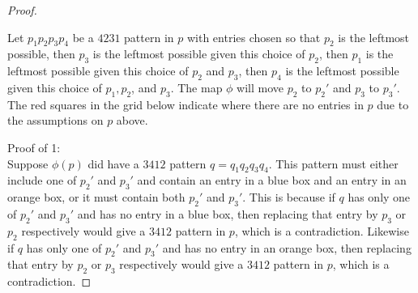 \documentclass[11pt]{amsart}
\theoremstyle{remark}
\numberwithin{equation}{section}
\begin{document}
\begin{proof}
\begin{figure}[h]
        \label{fig:placeholder}
    \end{figure}

    Let $p_1p_2p_3p_4$ be a $4231$ pattern in $p$ with entries chosen so that $p_2$ is the leftmost possible, then $p_3$ is the leftmost possible given this choice of $p_2$, then $p_1$ is the leftmost possible given this choice of $p_2$ and $p_3$, then $p_4$ is the leftmost possible given this choice of $p_1, p_2$, and $p_3$. The map $\phi$ will move $p_2$ to $p_2'$ and $p_3$ to $p_3'$. The red squares in the grid below indicate where there are no entries in $p$ due to the assumptions on $p$ above.

    Proof of 1:
    \\
    Suppose $\phi(p)$ did have a $3412$ pattern $q=q_1q_2q_3q_4$. This pattern must either include one of $p_2'$ and $p_3'$ and contain an entry in a blue box and an entry in an orange box, or it must contain both $p_2'$ and $p_3'$. This is because if $q$ has only one of $p_2'$ and $p_3'$ and has no entry in a blue box, then replacing that entry by $p_3$ or $p_2$ respectively would give a $3412$ pattern in $p$, which is a contradiction. Likewise if $q$ has only one of $p_2'$ and $p_3'$ and has no entry in an orange box, then replacing that entry by $p_2$ or $p_3$ respectively would give a $3412$ pattern in $p$, which is a contradiction.
    

\end{proof}
\end{document}
